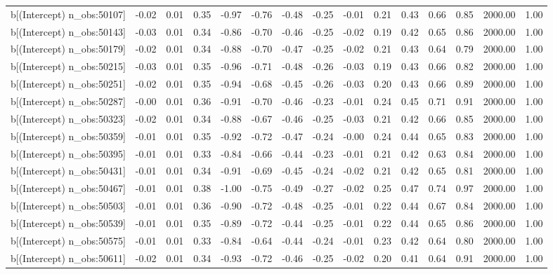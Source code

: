 \begin{table}[ht]
\begin{tabular}{rrrrrrrrrrrrrrr}
  b[(Intercept) n\_obs:50107] & -0.02 & 0.01 & 0.35 & -0.97 & -0.76 & -0.48 & -0.25 & -0.01 & 0.21 & 0.43 & 0.66 & 0.85 & 2000.00 & 1.00 \\ 
  b[(Intercept) n\_obs:50143] & -0.03 & 0.01 & 0.34 & -0.86 & -0.70 & -0.46 & -0.25 & -0.02 & 0.19 & 0.42 & 0.65 & 0.86 & 2000.00 & 1.00 \\ 
  b[(Intercept) n\_obs:50179] & -0.02 & 0.01 & 0.34 & -0.88 & -0.70 & -0.47 & -0.25 & -0.02 & 0.21 & 0.43 & 0.64 & 0.79 & 2000.00 & 1.00 \\ 
  b[(Intercept) n\_obs:50215] & -0.03 & 0.01 & 0.35 & -0.96 & -0.71 & -0.48 & -0.26 & -0.03 & 0.19 & 0.43 & 0.66 & 0.82 & 2000.00 & 1.00 \\ 
  b[(Intercept) n\_obs:50251] & -0.02 & 0.01 & 0.35 & -0.94 & -0.68 & -0.45 & -0.26 & -0.03 & 0.20 & 0.43 & 0.66 & 0.89 & 2000.00 & 1.00 \\ 
  b[(Intercept) n\_obs:50287] & -0.00 & 0.01 & 0.36 & -0.91 & -0.70 & -0.46 & -0.23 & -0.01 & 0.24 & 0.45 & 0.71 & 0.91 & 2000.00 & 1.00 \\ 
  b[(Intercept) n\_obs:50323] & -0.02 & 0.01 & 0.34 & -0.88 & -0.67 & -0.46 & -0.25 & -0.03 & 0.21 & 0.42 & 0.66 & 0.85 & 2000.00 & 1.00 \\ 
  b[(Intercept) n\_obs:50359] & -0.01 & 0.01 & 0.35 & -0.92 & -0.72 & -0.47 & -0.24 & -0.00 & 0.24 & 0.44 & 0.65 & 0.83 & 2000.00 & 1.00 \\ 
  b[(Intercept) n\_obs:50395] & -0.01 & 0.01 & 0.33 & -0.84 & -0.66 & -0.44 & -0.23 & -0.01 & 0.21 & 0.42 & 0.63 & 0.84 & 2000.00 & 1.00 \\ 
  b[(Intercept) n\_obs:50431] & -0.01 & 0.01 & 0.34 & -0.91 & -0.69 & -0.45 & -0.24 & -0.02 & 0.21 & 0.42 & 0.65 & 0.81 & 2000.00 & 1.00 \\ 
  b[(Intercept) n\_obs:50467] & -0.01 & 0.01 & 0.38 & -1.00 & -0.75 & -0.49 & -0.27 & -0.02 & 0.25 & 0.47 & 0.74 & 0.97 & 2000.00 & 1.00 \\ 
  b[(Intercept) n\_obs:50503] & -0.01 & 0.01 & 0.36 & -0.90 & -0.72 & -0.48 & -0.25 & -0.01 & 0.22 & 0.44 & 0.67 & 0.84 & 2000.00 & 1.00 \\ 
  b[(Intercept) n\_obs:50539] & -0.01 & 0.01 & 0.35 & -0.89 & -0.72 & -0.44 & -0.25 & -0.01 & 0.22 & 0.44 & 0.65 & 0.86 & 2000.00 & 1.00 \\ 
  b[(Intercept) n\_obs:50575] & -0.01 & 0.01 & 0.33 & -0.84 & -0.64 & -0.44 & -0.24 & -0.01 & 0.23 & 0.42 & 0.64 & 0.80 & 2000.00 & 1.00 \\ 
  b[(Intercept) n\_obs:50611] & -0.02 & 0.01 & 0.34 & -0.93 & -0.72 & -0.46 & -0.25 & -0.02 & 0.20 & 0.41 & 0.64 & 0.91 & 2000.00 & 1.00 \\ 

\end{tabular}
\end{table}
